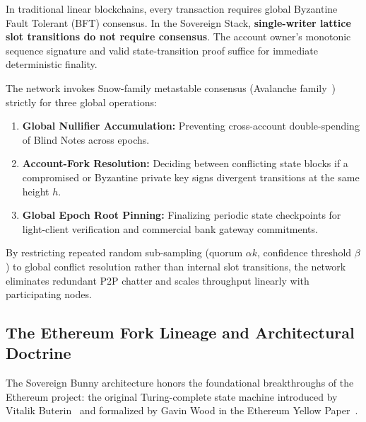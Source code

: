 \documentclass[a4paper,11pt,twoside,parskip=half-,headings=small]{scrartcl}
\begin{document}
In traditional linear blockchains, every transaction requires global Byzantine Fault
Tolerant (BFT) consensus. In the Sovereign Stack, \textbf{single-writer lattice slot
transitions do not require consensus}. The account owner's monotonic sequence signature
and valid state-transition proof suffice for immediate deterministic finality.

The network invokes Snow-family metastable consensus (Avalanche family~\cite{teamrocket2019})
strictly for three global operations:
\begin{enumerate}
  \item \textbf{Global Nullifier Accumulation:} Preventing cross-account double-spending
of Blind Notes across epochs.
  \item \textbf{Account-Fork Resolution:} Deciding between conflicting state blocks if
a compromised or Byzantine private key signs divergent transitions at the same
height $h$.
  \item \textbf{Global Epoch Root Pinning:} Finalizing periodic state checkpoints for
light-client verification and commercial bank gateway commitments.
\end{enumerate}
By restricting repeated random sub-sampling (quorum $\alpha k$, confidence threshold $\beta$)
to global conflict resolution rather than internal slot transitions, the network
eliminates redundant P2P chatter and scales throughput linearly with participating nodes.

\subsection{The Ethereum Fork Lineage and Architectural Doctrine}
\label{sec:ethereum_doctrine}

The Sovereign Bunny architecture honors the foundational breakthroughs of the Ethereum
project: the original Turing-complete state machine introduced by Vitalik Buterin~\cite{buterin2014ethereum}
and formalized by Gavin Wood in the Ethereum Yellow Paper~\cite{wood2014yellow}.
\end{document}
